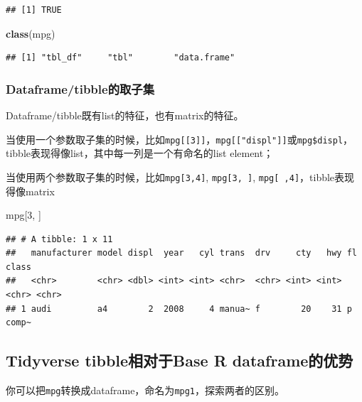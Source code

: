 \documentclass[]{book}
\newenvironment{Shaded}{\begin{snugshade}}{\end{snugshade}}
\newcommand{\DecValTok}[1]{\textcolor[rgb]{0.00,0.00,0.81}{#1}}
\newcommand{\KeywordTok}[1]{\textcolor[rgb]{0.13,0.29,0.53}{\textbf{#1}}}
\newcommand{\NormalTok}[1]{#1}
\begin{document}
\begin{verbatim}
## [1] TRUE
\end{verbatim}

\begin{Shaded}
\begin{Highlighting}[]
\KeywordTok{class}\NormalTok{(mpg)}
\end{Highlighting}
\end{Shaded}

\begin{verbatim}
## [1] "tbl_df"     "tbl"        "data.frame"
\end{verbatim}

\hypertarget{tbl-subsetting-more}{%
\subsubsection{Dataframe/tibble的取子集}\label{tbl-subsetting-more}}

Dataframe/tibble既有list的特征，也有matrix的特征。

当使用一个参数取子集的时候，比如\texttt{mpg{[}{[}3{]}{]}}，\texttt{mpg{[}{[}"displ"{]}{]}}或\texttt{mpg\$displ}，tibble表现得像list，其中每一列是一个有命名的list element；

当使用两个参数取子集的时候，比如\texttt{mpg{[}3,4{]}}, \texttt{mpg{[}3,\ {]}}, \texttt{mpg{[}\ ,4{]}}，tibble表现得像matrix

\begin{Shaded}
\begin{Highlighting}[]
\NormalTok{mpg[}\DecValTok{3}\NormalTok{, ]}
\end{Highlighting}
\end{Shaded}

\begin{verbatim}
## # A tibble: 1 x 11
##   manufacturer model displ  year   cyl trans  drv     cty   hwy fl    class
##   <chr>        <chr> <dbl> <int> <int> <chr>  <chr> <int> <int> <chr> <chr>
## 1 audi         a4        2  2008     4 manua~ f        20    31 p     comp~
\end{verbatim}

\hypertarget{tibble-df-diff}{%
\subsection{Tidyverse tibble相对于Base R dataframe的优势}\label{tibble-df-diff}}

你可以把\texttt{mpg}转换成dataframe，命名为\texttt{mpg1}，探索两者的区别。
\end{document}
